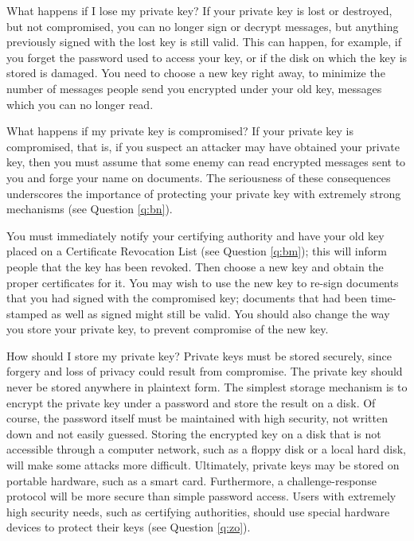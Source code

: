 {What happens if I lose my private key?}
If your private key is lost or destroyed, but not compromised, you can no 
longer sign or decrypt messages, but anything previously signed with the 
lost key is still valid. This can happen, for example, if you forget the 
password used to access your key, or if the disk on which the key is stored 
is damaged. You need to choose a new key right away, to minimize the number 
of messages people send you encrypted under your old key, messages which you 
can no longer read. 

{What happens if my private key is compromised?}
If your private key is compromised, that is, if you suspect an attacker may 
have obtained your private key, then you must assume that some enemy can
read encrypted messages sent to you and forge your name on documents. The 
seriousness of these consequences underscores the importance of protecting 
your private key with extremely strong mechanisms (see Question \ref{q:bn}).

You must immediately notify your certifying authority and have your old key 
placed on a Certificate Revocation List (see Question \ref{q:bm}); this will 
inform people that the key has been revoked. Then choose a new key and obtain
the proper certificates for it. You may wish to use the new key to re-sign 
documents that you had signed with the compromised key; documents that had 
been time-stamped as well as signed might still be valid. You should also 
change the way you store your private key, to prevent compromise of the new 
key.

{How should I store my private key?}
Private keys must be stored securely, since forgery and loss of privacy 
could result from compromise. The private key should never be stored 
anywhere in plaintext form. The simplest storage mechanism is to encrypt 
the private key under a password and store the result on a disk. Of course, 
the password itself must be maintained with high security, not written down 
and not easily guessed. Storing the encrypted key on a disk that is not 
accessible through a computer network, such as a floppy disk or a local 
hard disk, will make some attacks more difficult. Ultimately, private keys 
may be stored on portable hardware, such as a smart card. Furthermore, a 
challenge-response protocol will be more secure than simple password access. 
Users with extremely high security needs, such as certifying authorities, 
should use special hardware devices to protect their keys (see Question 
\ref{q:zo}).

